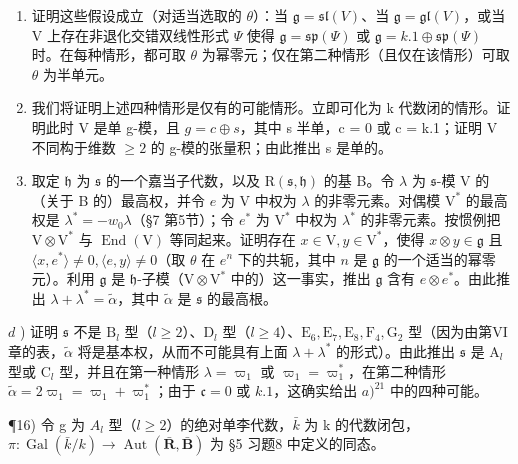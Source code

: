 \begin{enumerate}
\def\labelenumi{\alph{enumi})}
\item
  证明这些假设成立（对适当选取的 \(\theta\)）：当 \(\mathfrak{g} = \mathfrak{sl}(V)\)、当 \(\mathfrak{g} = \mathfrak{gl}(V)\)，或当 V 上存在非退化交错双线性形式 \(\varPsi\) 使得 \(\mathfrak{g} = \mathfrak{sp}(\varPsi)\) 或 \(\mathfrak{g} = k.1 \oplus \mathfrak{sp}(\varPsi)\) 时。在每种情形，都可取 \(\theta\) 为幂零元；仅在第二种情形（且仅在该情形）可取 \(\theta\) 为半单元。
\item
  我们将证明上述四种情形是仅有的可能情形。立即可化为 k 代数闭的情形。证明此时 V 是单 g-模，且 \(g = c \oplus s\)，其中 s 半单，c = 0 或 c = k.1；证明 V 不同构于维数 \(\geq 2\) 的 g-模的张量积；由此推出 s 是单的。
\item
  取定 \(\mathfrak{h}\) 为 \(\mathfrak{s}\) 的一个嘉当子代数，以及 \(\mathrm{R}(\mathfrak{s},\mathfrak{h})\) 的基 B。令 \(\lambda\) 为 \(\mathfrak{s}\)-模 V 的（关于 B 的）最高权，并令 \(e\) 为 V 中权为 \(\lambda\) 的非零元素。对偶模 \(\mathrm{V}^*\) 的最高权是 \(\lambda^{*} = -w_{0}\lambda\)（§7 第5节）；令 \(e^*\) 为 \(\mathrm{V}^*\) 中权为 \(\lambda^*\) 的非零元素。按惯例把 \(\mathrm{V} \otimes \mathrm{V}^*\) 与 \(\operatorname{End}(\mathrm{V})\) 等同起来。证明存在 \(x \in \mathrm{V}, y \in \mathrm{V}^*\)，使得 \(x \otimes y \in \mathfrak{g}\) 且 \(\langle x, e^* \rangle \neq 0, \langle e, y \rangle \neq 0\)（取 \(\theta\) 在 \(e^n\) 下的共轭，其中 \(n\) 是 \(\mathfrak{g}\) 的一个适当的幂零元）。利用 \(\mathfrak{g}\) 是 \(\mathfrak{h}\)-子模（\(\mathrm{V} \otimes \mathrm{V}^*\) 中的）这一事实，推出 \(\mathfrak{g}\) 含有 \(e \otimes e^*\)。由此推出 \(\lambda + \lambda^{*} = \tilde{\alpha}\)，其中 \(\tilde{\alpha}\) 是 \(\mathfrak{s}\) 的最高根。
\end{enumerate}

\(d\) ) 证明 \(\mathfrak{s}\) 不是 \(\mathrm{B}_l\) 型（\(l\geq 2\)）、\(\mathrm{D}_l\) 型（\(l\geq 4\)）、\(\mathrm{E}_6,\mathrm{E}_7,\mathrm{E}_8,\mathrm{F}_4,\mathrm{G}_2\) 型（因为由第VI章的表，\(\tilde{\alpha}\) 将是基本权，从而不可能具有上面 \(\lambda +\lambda^{*}\) 的形式）。由此推出 \(\mathfrak{s}\) 是 \(\mathrm{A}_l\) 型或 \(\mathrm{C}_l\) 型，并且在第一种情形 \(\lambda = \varpi_1\) 或 \(\varpi_1 = \varpi_1^*\)，在第二种情形 \(\tilde{\alpha} = 2\varpi_1 = \varpi_1 + \varpi_1^*\)；由于 \(\mathfrak{c} = 0\) 或 \(k.1\)，这确实给出 \(a)^{21}\) 中的四种可能。

¶16) 令 g 为 \(A_{l}\) 型（\(l \geq 2\)）的绝对单李代数，\(\bar{k}\) 为 k 的代数闭包，\(\pi : \operatorname{Gal}(\bar{k}/k) \to \operatorname{Aut}(\bar{\mathbf{R}},\bar{\mathbf{B}})\) 为 §5 习题8 中定义的同态。

